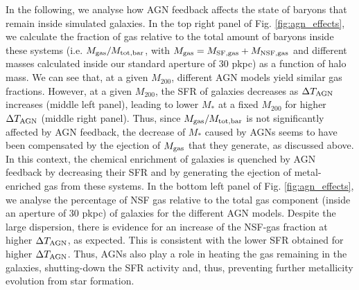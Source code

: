 \documentclass[useAMS,usenatbib]{mn2e}
\begin{document}
In the following, we analyse how AGN feedback affects the state of baryons that remain inside simulated 
galaxies.
In the top right panel of Fig. \ref{fig:agn_effects},
we calculate the fraction of gas relative to the total amount of baryons inside these systems
(i.e. $M_{\rm gas} / M_{\rm tot,bar}$, with $M_{\rm gas} = M_{\rm SF,gas}+M_{\rm NSF,gas}$ and different masses 
calculated inside our standard aperture of 30 pkpc)
as a function of halo mass.
We can see that, at a given $M_{200}$, different AGN models yield similar gas fractions. 
However, at a given $M_{200}$, the SFR of galaxies decreases as $\Delta T_{\rm AGN}$ increases (middle left panel),
leading to lower $M_*$ at a fixed $M_{200}$ for higher $\Delta T_{\rm AGN}$ (middle right panel).  Thus, since $M_{\rm gas} / M_{\rm tot,bar}$
is not significantly affected by AGN feedback,
the decrease of $M_*$ caused by AGNs seems to have been compensated by the ejection of $M_{\rm gas}$
that they generate, as discussed above. 
In this context, the chemical enrichment of galaxies is quenched by AGN feedback by decreasing their SFR
and by generating the ejection of metal-enriched gas from these systems.
In the bottom left panel of Fig. \ref{fig:agn_effects}, we analyse the percentage of NSF gas
relative to the total gas component (inside an aperture of 30 pkpc) of galaxies for the different AGN models.  Despite the large dispersion,
there is evidence for an increase of the NSF-gas fraction at higher $\Delta T_{\rm AGN}$,
as expected.  This is consistent with the lower SFR obtained for higher $\Delta T_{\rm AGN}$.
Thus, AGNs also play a role in heating the gas remaining in the galaxies, shutting-down the SFR
activity and, thus, preventing further metallicity evolution from star formation.
\end{document}
